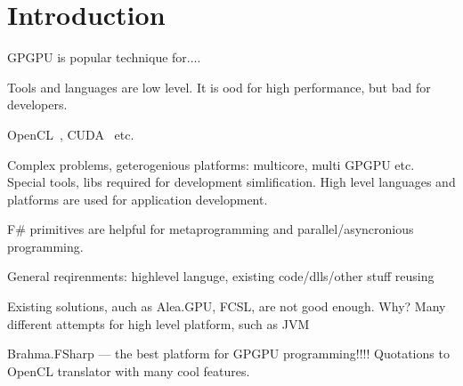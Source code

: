 \section{Introduction}

GPGPU is popular technique for....

Tools and languages are low level.
It is ood for high performance, but bad for developers.

OpenCL~\cite{OpenCL}, CUDA~\cite{CUDA} etc.

Complex problems, geterogenious platforms: multicore, multi GPGPU etc.
Special tools, libs required for development simlification.
High level languages and platforms are used for application development.

F\# primitives are helpful for metaprogramming and parallel/asyncronious programming.

General reqirenments: highlevel languge, existing code/dlls/other stuff reusing

Existing solutions, auch as Alea.GPU, FCSL, are not good enough. Why?
Many different attempts for high level platform, such as JVM~\cite{rootbeer, HaskellGPU, jcuda, ScalaGPU, RustGPU}

Brahma.FSharp --- the best platform for GPGPU programming!!!!
Quotations to OpenCL translator with many cool features.